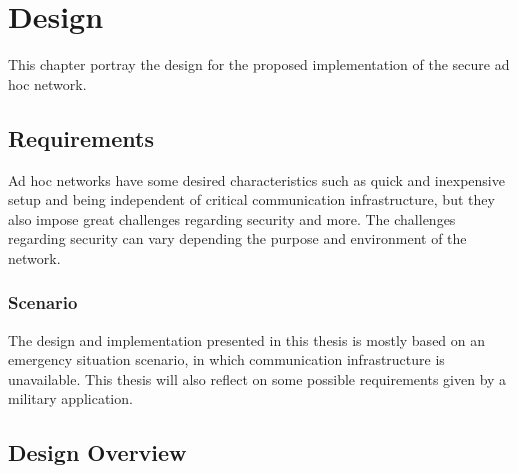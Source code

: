 \chapter{Design}
This chapter portray the design for the proposed implementation of the secure ad
hoc network.

\section{Requirements}
Ad hoc networks have some desired characteristics such as quick and inexpensive
setup and being independent of critical communication infrastructure, but they
also impose great challenges regarding security and more. The challenges
regarding security can vary depending the purpose and environment of the
network.

\subsection{Scenario}
The design and implementation presented in this thesis is mostly based on an
emergency situation scenario, in which communication infrastructure is
unavailable. This thesis will also reflect on some possible requirements given
by a military application.



\section{Design Overview}
